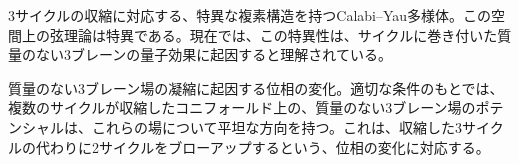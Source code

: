 {3サイクルの収縮に対応する、特異な複素構造を持つCalabi--Yau多様体。この空間上の弦理論は特異である。現在では、この特異性は、サイクルに巻き付いた質量のない3ブレーンの量子効果に起因すると理解されている。}

{質量のない3ブレーン場の凝縮に起因する位相の変化。適切な条件のもとでは、複数のサイクルが収縮したコニフォールド上の、質量のない3ブレーン場のポテンシャルは、これらの場について平坦な方向を持つ。これは、収縮した3サイクルの代わりに2サイクルをブローアップするという、位相の変化に対応する。}

